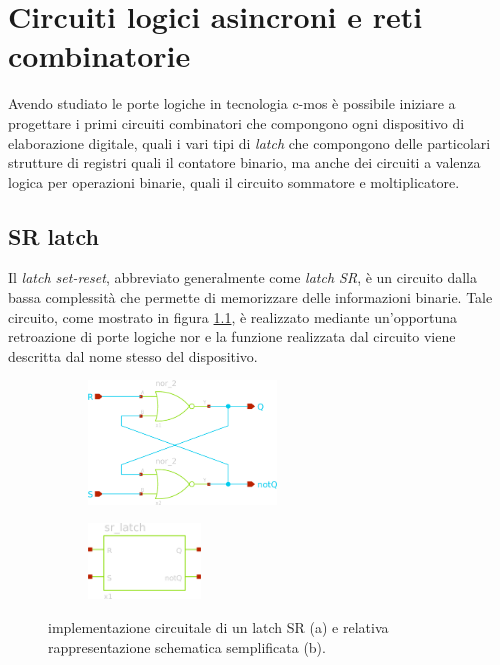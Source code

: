 \chapter{Circuiti logici asincroni e reti combinatorie}
	
	Avendo studiato le porte logiche in tecnologia c-mos è possibile iniziare a progettare i primi circuiti combinatori che compongono ogni dispositivo di elaborazione digitale, quali i vari tipi di \textit{latch} che compongono delle particolari strutture di registri quali il contatore binario, ma anche dei circuiti a valenza logica per operazioni binarie, quali il circuito sommatore e moltiplicatore.
	
\section{SR latch}
	Il \textit{latch set-reset}, abbreviato generalmente come \textit{latch SR}, è un circuito dalla bassa complessità che permette di memorizzare delle informazioni binarie. Tale circuito, come mostrato in figura \ref{fig:srl:schematico}, è realizzato mediante un'opportuna retroazione di porte logiche nor e la funzione realizzata dal circuito viene descritta dal nome stesso del dispositivo.
	
	\begin{figure}[bht]
		\centering
		\begin{subfigure}{0.48\linewidth}
			\centering
			\includegraphics[width=5cm]{Immagini/srlatch-sch} \caption{}
		\end{subfigure}
		\begin{subfigure}{0.48\linewidth}
			\centering
			\includegraphics[width=3cm]{Immagini/srlatch-simple} \caption{}
		\end{subfigure}
		\caption{implementazione circuitale di un latch SR (a) e relativa rappresentazione schematica semplificata (b).}
		\label{fig:srl:schematico}
	\end{figure}
	
